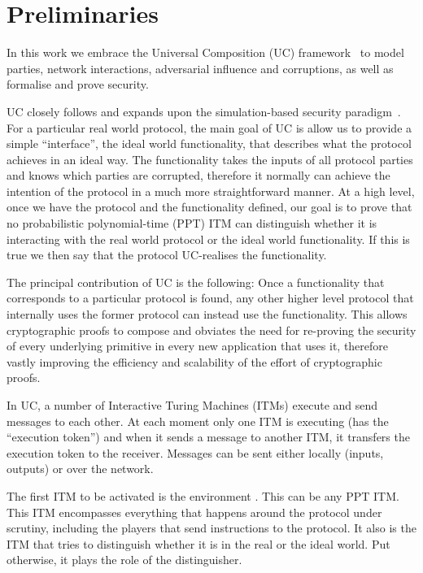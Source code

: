 \section{Preliminaries}
  In this work we embrace the Universal Composition (UC) framework~\cite{uc} to
  model parties, network interactions, adversarial influence and corruptions, as
  well as formalise and prove security.

  UC closely follows and expands upon the simulation-based security
  paradigm~\cite{DBLP:books/sp/17/Lindell17}. For a particular real world
  protocol, the main goal of UC is allow us to provide a simple ``interface'',
  the ideal world functionality, that describes what the protocol achieves in an
  ideal way. The functionality takes the inputs of all protocol parties and
  knows which parties are corrupted, therefore it normally can achieve the
  intention of the protocol in a much more straightforward manner. At a high
  level, once we have the protocol and the functionality defined, our goal is to
  prove that no probabilistic polynomial-time (PPT) ITM can distinguish whether
  it is interacting with the real world protocol or the ideal world
  functionality. If this is true we then say that the protocol UC-realises the
  functionality.

  The principal contribution of UC is the following: Once a functionality that
  corresponds to a particular protocol is found, any other higher level protocol
  that internally uses the former protocol can instead use the functionality.
  This allows cryptographic proofs to compose and obviates the need for
  re-proving the security of every underlying primitive in every new application
  that uses it, therefore vastly improving the efficiency and scalability of the
  effort of cryptographic proofs.

  In UC, a number of Interactive Turing Machines (ITMs) execute and send
  messages to each other. At each moment only one ITM is executing (has the
  ``execution token'') and when it sends a message to another ITM, it transfers
  the execution token to the receiver. Messages can be sent either locally
  (inputs, outputs) or over the network.

  The first ITM to be activated is the environment \environment. This can be any
  PPT ITM. This ITM encompasses everything that happens around the protocol
  under scrutiny, including the players that send instructions to the protocol.
  It also is the ITM that tries to distinguish whether it is in the real or the
  ideal world. Put otherwise, it plays the role of the distinguisher.

